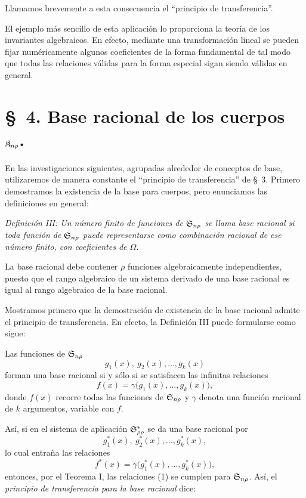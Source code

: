\documentclass[11pt]{article}
\begin{document}
Llamamos brevemente a esta consecuencia el ``principio de transferencia''.

\providecommand{\Lsys}{\mathfrak{L}}
\providecommand{\Jdom}{\mathfrak{J}}

\clearpage
El ejemplo más sencillo de esta aplicación lo proporciona la teoría de los invariantes algebraicos. En efecto, mediante una transformación lineal se pueden fijar numéricamente algunos coeficientes de la forma fundamental de tal modo que todas las relaciones válidas para la forma especial sigan siendo válidas en general.

\section*{\S\ 4. Base racional de los cuerpos $\mathfrak{K}_{n\rho}$.}

En las investigaciones siguientes, agrupadas alrededor de conceptos de base, utilizaremos de manera constante el ``principio de transferencia'' de \S\ 3. Primero demostramos la existencia de la base para cuerpos, pero enunciamos las definiciones en general:

\emph{Definición III: Un número finito de funciones de $\mathfrak{S}_{n\rho}$ se llama base racional si toda función de $\mathfrak{S}_{n\rho}$ puede representarse como combinación racional de ese número finito, con coeficientes de $\Omega$.}

La base racional debe contener $\rho$ funciones algebraicamente independientes, puesto que el rango algebraico de un sistema derivado de una base racional es igual al rango algebraico de la base racional.

Mostramos primero que la demostración de existencia de la base racional admite el principio de transferencia. En efecto, la Definición III puede formularse como sigue:

Las funciones de $\mathfrak{S}_{n\rho}$
\[
  g_1(x),\ g_2(x),\ldots, g_k(x)
\]
forman una base racional si y sólo si se satisfacen las infinitas relaciones
\begin{equation}
  f(x)=\gamma\bigl(g_1(x),\ldots,g_k(x)\bigr),
\tag{1}
\end{equation}
donde $f(x)$ recorre todas las funciones de $\mathfrak{S}_{n\rho}$ y $\gamma$ denota una función racional de $k$ argumentos, variable con $f$.

Así, si en el sistema de aplicación $\mathfrak{S}^*_{\rho\rho}$ se da una base racional por
\[
  g_1^*(x),\ g_2^*(x),\ldots,g_k^*(x),
\]
lo cual entraña las relaciones
\[
  f^*(x)=\gamma\bigl(g_1^*(x),\ldots,g_k^*(x)\bigr),
\]
entonces, por el Teorema I, las relaciones (1) se cumplen para $\mathfrak{S}_{n\rho}$. Así, el \emph{principio de transferencia para la base racional} dice:
\end{document}

